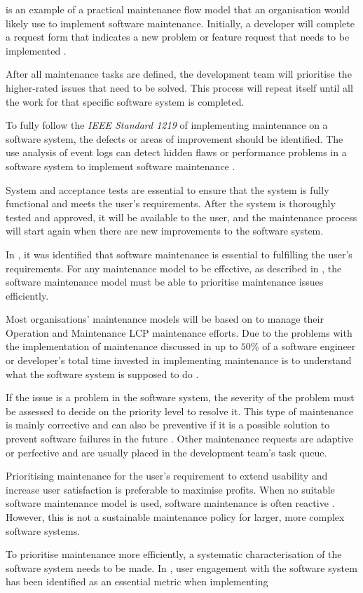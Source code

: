  is an example of a practical maintenance flow model that an organisation would likely use to implement software maintenance. Initially, a developer will complete a request form that indicates a new problem or feature request that needs to be implemented \cite{Tang2010}. \par After all maintenance tasks are defined, the development team will prioritise the higher-rated issues that need to be solved. This process will repeat itself until all the work for that specific software system is completed.\par To fully follow the \textit{IEEE Standard 1219} of implementing maintenance on a software system, the defects or areas of improvement should be identified. The use analysis of event logs can detect hidden flaws or performance problems in a software system to implement software maintenance \cite{Cinque2013, Rong2018a, Levin2019}.\par System and acceptance tests are essential to ensure that the system is fully functional and meets the user's requirements. After the system is thoroughly tested and approved, it will be available to the user, and the maintenance process will start again when there are new improvements to the software system.\par In , it was identified that software maintenance is essential to fulfilling the user's requirements. For any maintenance model to be effective, as described in , the software maintenance model must be able to prioritise maintenance issues efficiently. \par Most organisations' maintenance models will be based on  to manage their Operation and Maintenance LCP maintenance efforts. Due to the problems with the implementation of maintenance discussed in  up to $50\%$ of a software engineer or developer's total time invested in implementing maintenance is to understand what the software system is supposed to do \cite{Tang2010}. \par If the issue is a problem in the software system, the severity of the problem must be assessed to decide on the priority level to resolve it. This type of maintenance is mainly corrective and can also be preventive if it is a possible solution to prevent software failures in the future \cite{Tang2010}. Other maintenance requests are adaptive or perfective and are usually placed in the development team's task queue. \par Prioritising maintenance for the user's requirement to extend usability and increase user satisfaction is preferable to maximise profits. When no suitable software maintenance model is used, software maintenance is often reactive \cite{Araujo2021}. However, this is not a sustainable maintenance policy for larger, more complex software systems. \par To prioritise maintenance more efficiently, a systematic characterisation of the software system needs to be made. In , user engagement with the software system has been identified as an essential metric when implementing 